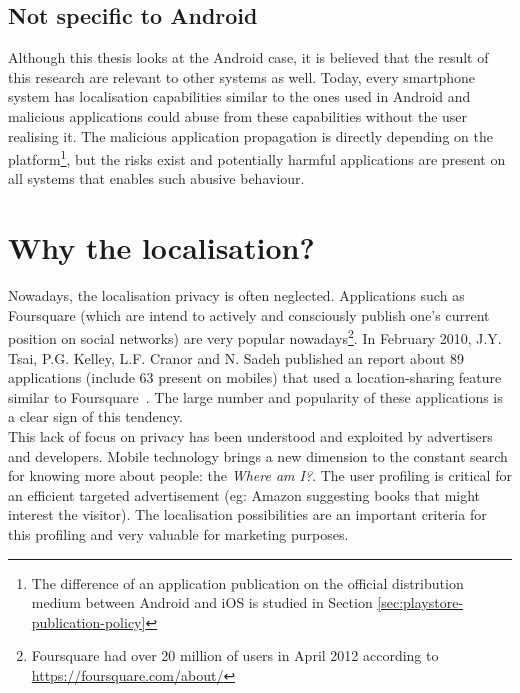 \subsection*{Not specific to Android}
Although this thesis looks at the Android case, it is believed that the result of this research are relevant to other systems as well.
Today, every smartphone system has localisation capabilities similar to the ones used in Android and malicious applications could abuse from these capabilities without the user realising it.
The malicious application propagation is directly depending on the platform\footnote{The difference of an application publication on the official distribution medium between Android and iOS is studied in Section \ref{sec:playstore-publication-policy}}, but the risks exist and potentially harmful applications are present on all systems that enables such abusive behaviour.

\section*{Why the localisation?}
\label{sec:why-localisation}

Nowadays, the localisation privacy is often neglected.
Applications such as Foursquare (which are intend to actively and consciously publish one's current position on social networks) are very popular nowadays\footnote{Foursquare had over 20 million of users in April 2012 according to \url{https://foursquare.com/about/}}.
In February 2010, J.Y. Tsai, P.G. Kelley, L.F. Cranor and N. Sadeh published an report about 89 applications (include 63 present on mobiles) that used a location-sharing feature similar to Foursquare~\cite{loc-share-analysis}.
The large number and popularity of these applications is a clear sign of this tendency.\\

This lack of focus on privacy has been understood and exploited by advertisers and developers.
Mobile technology brings a new dimension to the constant search for knowing more about people: the \emph{Where am I?}.
The user profiling is critical for an efficient targeted advertisement (eg: Amazon suggesting books that might interest the visitor).
The localisation possibilities are an important criteria for this profiling and very valuable for marketing purposes.\\


